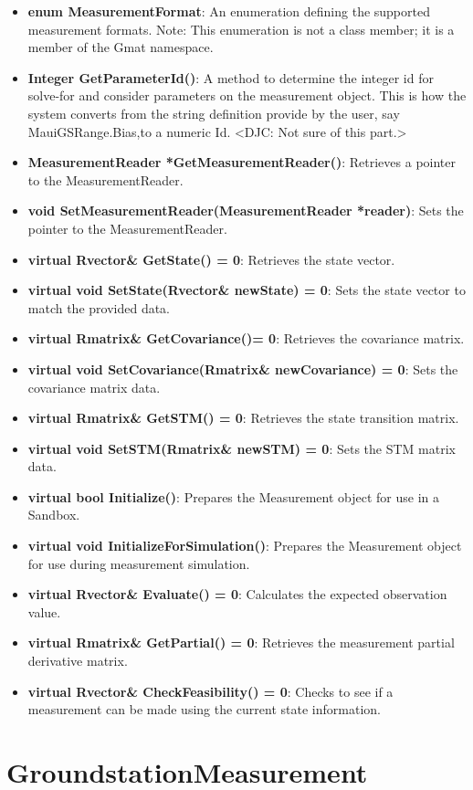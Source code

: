 \begin{itemize}
\item \textbf{enum MeasurementFormat}: An enumeration defining the supported measurement formats.  Note: This enumeration is not a class member; it is a member of the Gmat namespace.
\item \textbf{Integer GetParameterId()}: A method to determine the integer id for solve-for and consider parameters on the measurement object.  This is how the system converts from the string definition provide by the user, say MauiGSRange.Bias,to a numeric Id.  <DJC: Not sure of this part.>
\item \textbf{MeasurementReader *GetMeasurementReader()}:  Retrieves a pointer to the
MeasurementReader.
\item \textbf{void SetMeasurementReader(MeasurementReader *reader)}:  Sets the pointer to the MeasurementReader.
\item \textbf{virtual Rvector\& GetState() = 0}: Retrieves the state vector.
\item \textbf{virtual void SetState(Rvector\& newState) = 0}:  Sets the state vector to match the provided data.
\item \textbf{virtual Rmatrix\& GetCovariance()= 0}:  Retrieves the covariance matrix.
\item \textbf{virtual void SetCovariance(Rmatrix\& newCovariance) = 0}:  Sets the covariance matrix data.
\item \textbf{virtual Rmatrix\& GetSTM() = 0}: Retrieves the state transition matrix.
\item \textbf{virtual void SetSTM(Rmatrix\& newSTM) = 0}: Sets the STM matrix data.
\item \textbf{virtual bool Initialize()}: Prepares the Measurement object for use in a Sandbox.
\item \textbf{virtual void InitializeForSimulation()}:  Prepares the Measurement object for use during measurement simulation.
\item \textbf{virtual Rvector\& Evaluate() = 0}:  Calculates the expected observation value.
\item \textbf{virtual Rmatrix\& GetPartial() = 0}:  Retrieves the measurement partial derivative matrix.
\item \textbf{virtual Rvector\& CheckFeasibility() = 0}:  Checks to see if a measurement can be made using the current state information.
\end{itemize}

\section{GroundstationMeasurement}

